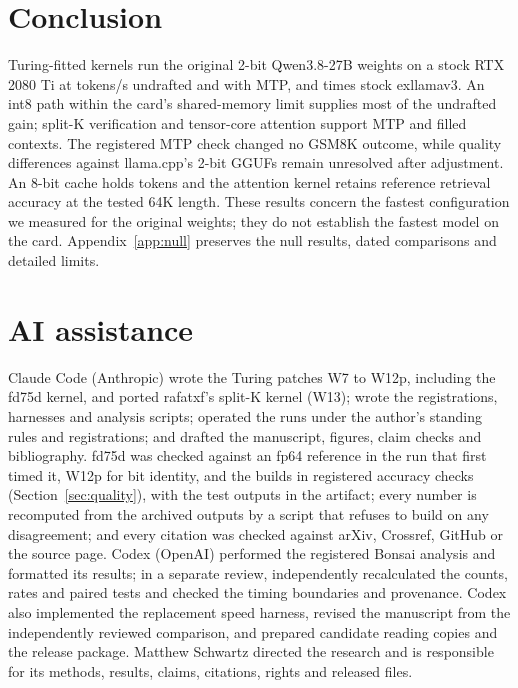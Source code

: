 \documentclass[11pt,letterpaper]{article}
\begin{document}
\section{Conclusion}
\label{sec:conclusion}
Turing-fitted kernels run the original 2-bit Qwen3.8-27B weights on a stock
RTX 2080 Ti at \PeFtWZero{} tokens/s undrafted and \PeFtSTwoMtpZero{} with
MTP, \PeFtUndraftedRatio{} and \PeFtMtpRatio{} times stock exllamav3.
An int8 path within the card's shared-memory limit supplies most of the
undrafted gain; split-K verification and tensor-core attention support
MTP and filled contexts. The registered MTP check changed no GSM8K
outcome, while quality differences against llama.cpp's 2-bit GGUFs remain
unresolved after adjustment. An 8-bit cache holds \PeReachEE{} tokens and
the attention kernel retains reference retrieval accuracy at the tested
64K length. These results concern the fastest configuration we measured
for the original weights; they do not establish the fastest model on the
card. Appendix~\ref{app:null} preserves the null results, dated comparisons
and detailed limits.


\section*{AI assistance}
Claude Code (Anthropic) wrote the Turing patches W7 to W12p, including the
fd75d kernel, and ported rafatxf's split-K kernel (W13); wrote the
registrations, harnesses and analysis scripts; operated the runs under the
author's standing rules and registrations; and drafted the manuscript,
figures, claim checks and bibliography. fd75d was checked against an fp64
reference in the run that first timed it, W12p for bit identity, and the builds in
registered accuracy checks (Section~\ref{sec:quality}), with the test outputs
in the artifact; every number is recomputed from the archived
outputs by a script that refuses to build on any disagreement; and every
citation was checked against arXiv, Crossref, GitHub or the source page.
Codex (OpenAI) performed the registered Bonsai analysis and formatted its results;
in a separate review, independently recalculated the counts, rates and paired
tests and checked the timing boundaries and provenance. Codex also implemented the replacement speed harness, revised the manuscript
from the independently reviewed comparison, and prepared candidate reading
copies and the release package.
Matthew Schwartz directed the research and is responsible for its methods,
results, claims, citations, rights and released files.
\end{document}
